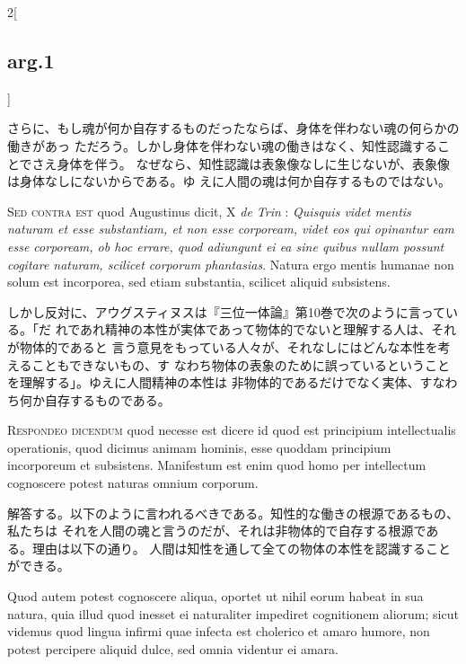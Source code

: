 \documentclass[paper=a4paper,fontsize=10pt,jafontsize=9pt,titlepage]{jlreq}
\begin{document}
\begin{paracol}{2}[\subsection{arg.1}]
\switchcolumn

さらに、もし魂が何か自存するものだったならば、身体を伴わない魂の何らかの働きがあっ
ただろう。しかし身体を伴わない魂の働きはなく、知性認識することでさえ身体を伴う。
なぜなら、知性認識は表象像なしに生じないが、表象像は身体なしにないからである。ゆ
えに人間の魂は何か自存するものではない。

\switchcolumn*[\subsection{s.c.}]

{\scshape Sed contra est} quod Augustinus dicit, X {\itshape de Trin} :
{\itshape Quisquis videt mentis naturam et esse substantiam, et non esse
corpoream, videt eos qui opinantur eam esse corpoream, ob hoc errare, quod
adiungunt ei ea sine quibus nullam possunt cogitare naturam, scilicet corporum
phantasias}. Natura ergo mentis humanae non solum est incorporea, sed etiam
substantia, scilicet aliquid subsistens.

 \switchcolumn

しかし反対に、アウグスティヌスは『三位一体論』第10巻で次のように言っている。「だ
れであれ精神の本性が実体であって物体的でないと理解する人は、それが物体的であると
言う意見をもっている人々が、それなしにはどんな本性を考えることもできないもの、す
なわち物体の表象のために誤っているということを理解する」。ゆえに人間精神の本性は
非物体的であるだけでなく実体、すなわち何か自存するものである。


{\scshape Respondeo dicendum} quod necesse est dicere id quod est principium
intellectualis operationis, quod dicimus animam hominis, esse quoddam principium
incorporeum et subsistens. Manifestum est enim quod homo per intellectum
cognoscere potest naturas omnium corporum.

\switchcolumn

解答する。以下のように言われるべきである。知性的な働きの根源であるもの、私たちは
それを人間の魂と言うのだが、それは非物体的で自存する根源である。理由は以下の通り。
人間は知性を通して全ての物体の本性を認識することができる。

\switchcolumn*

 Quod autem potest cognoscere aliqua, oportet ut nihil eorum habeat in sua
 natura, quia illud quod inesset ei naturaliter impediret cognitionem aliorum;
 sicut videmus quod lingua infirmi quae infecta est cholerico et amaro humore,
 non potest percipere aliquid dulce, sed omnia videntur ei amara.


\end{paracol}
\end{document}
